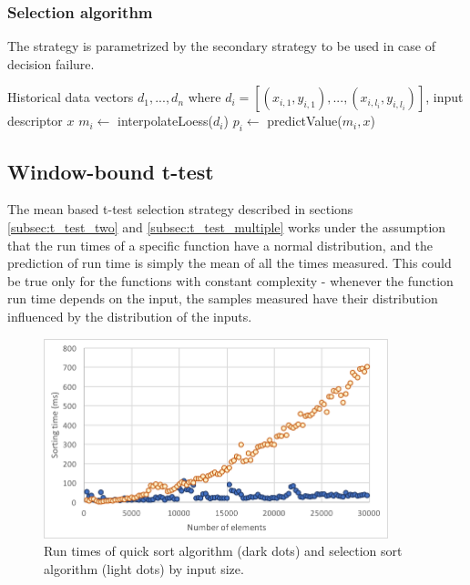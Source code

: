 \subsubsection{Selection algorithm}

The strategy is parametrized by the secondary strategy to be used in case of decision failure.

\begin{algorithmic}[1] %
	\INPUT Historical data vectors $d_1,...,d_n$ where $d_i = [(x_{i,1}, y_{i,1}),...,(x_{i,l_i}, y_{i,l_i})]$, input descriptor $x$
	\State $m_i \gets$ interpolateLoess($d_i$)
	\State $p_i \gets$ predictValue($m_i, x$)
	\State{}
	\EndIf
	\EndFor
	\State{}
\end{algorithmic}

\subsection{Window-bound t-test}
\label{subsec:window_bound_t_test}

The mean based t-test selection strategy described in sections \ref{subsec:t_test_two} and \ref{subsec:t_test_multiple} works under the assumption that the run times of a specific function have a normal distribution, and the prediction of run time is simply the mean of all the times measured. This could be true only for the functions with constant complexity - whenever the function run time depends on the input, the samples measured have their distribution influenced by the distribution of the inputs.

\begin{figure}[h!]
	\captionsetup{justification=centering,margin=0.5cm}
	\centerline{\mbox{\includegraphics[width=100mm]{./img/quick_vs_selection.png}}}
	\caption{Run times of quick sort algorithm (dark dots) and selection sort algorithm (light dots) by input size.}
	\label{fig:quick_vs_selection}
\end{figure}

